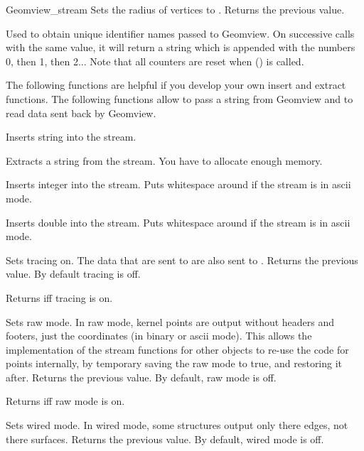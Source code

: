 \begin{ccClass}{Geomview_stream}
{Sets the radius of vertices to . Returns the previous value.}

{Used to obtain unique identifier names passed to Geomview.  On successive
calls with the same  value, it will return a string which is 
appended with the numbers 0, then 1, then 2...  Note that all counters are
reset when () is called.}



\newpage
\begin{ccAdvanced}


The following functions are helpful if you develop your own insert
and extract functions. The following functions allow to pass a string
from Geomview and to read data sent back by Geomview.

{Inserts string  into the stream.}


{Extracts a string  from the stream.
\ccPrecond You have to allocate enough memory.}

{Inserts integer  into the stream. Puts whitespace around if the
stream is in ascii mode.}

{Inserts double  into the stream. Puts whitespace around if the
stream is in ascii mode.}

{Sets tracing on. The data that are sent to  are also
 sent to .  Returns the previous value. By default tracing is
 off.}

{Returns  iff tracing is on.}

{Sets raw mode.  In raw mode, kernel points are output without headers and
 footers, just the coordinates (in binary or ascii mode).  This allows the
 implementation of the stream functions for other objects to re-use the
 code for points internally, by temporary saving the raw mode to true, and
 restoring it after.
   Returns the previous value. By default, raw mode is off.}

{Returns  iff raw mode is on.}

{Sets wired mode.  In wired mode, some structures output only there edges,
 not there surfaces.
 Returns the previous value. By default, wired mode is off.}


\end{ccAdvanced}
\end{ccClass}
